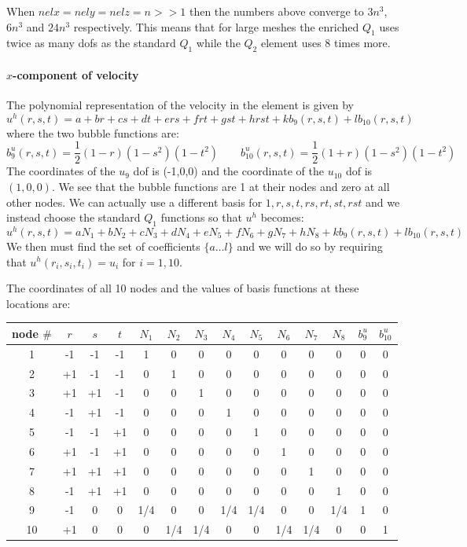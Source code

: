 When $nelx=nely=nelz=n>>1$ then the numbers above converge to 
$3n^3$, $6n^3$ and $24n^3$ respectively. This means that for large meshes 
the enriched $Q_1$ uses twice as many dofs as the standard $Q_1$ while the 
$Q_2$ element uses 8 times more. 



\paragraph{$x$-component of velocity} The polynomial representation of the velocity in the element is given by 
\[
u^h(r,s,t) = a + br +c s + d t +e rs + f rt + g st + h rst
+ k b_9(r,s,t) + l b_{10}(r,s,t)
\]
where the two bubble functions are:
\[
b_9^u(r,s,t)=\frac{1}{2}(1-r)(1-s^2)(1-t^2)
\qquad
b_{10}^u(r,s,t)=\frac{1}{2}(1+r)(1-s^2)(1-t^2)
\]
The coordinates of the $u_9$ dof is (-1,0,0) and the coordinate of the $u_{10}$ dof is $(1,0,0)$.
We see that the bubble functions are 1 at their nodes and zero at all other nodes.
We can actually use a different basis for ${1,r,s,t,rs,rt,st,rst}$ and we 
instead choose the standard $Q_1$ functions so that $u^h$ becomes:
\[
u^h(r,s,t) = aN_1 + b N_2 + cN_3 +dN_4 + eN_5 + fN_6 + gN_7 + hN_8 
+ k b_9(r,s,t) + l b_{10}(r,s,t)
\]
We then must find the set of coefficients $\{a \dots l\}$ and we will do so by 
requiring that $u^h(r_i,s_i,t_i)=u_i$ for $i=1,10$. 

The coordinates of all 10 nodes and the values of basis functions at these locations are:

\begin{center}
\begin{tabular}{c|ccc|cccccccc|cc}
\hline
node $\#$  & $r$ & $s$ & $t$ & $N_1$ & $N_2$ & $N_3$ & $N_4$ & $N_5$ & $N_6$ & $N_7$ & $N_8$ & $b_9^u$ & $b_{10}^u$\\
\hline\hline
1 & -1 & -1 & -1 & 1 & 0 & 0 & 0 & 0 & 0 & 0 & 0 & 0 & 0\\
2 & +1 & -1 & -1 & 0 & 1 & 0 & 0 & 0 & 0 & 0 & 0 & 0 & 0\\
3 & +1 & +1 & -1 & 0 & 0 & 1 & 0 & 0 & 0 & 0 & 0 & 0 & 0\\
4 & -1 & +1 & -1 & 0 & 0 & 0 & 1 & 0 & 0 & 0 & 0 & 0 & 0\\
5 & -1 & -1 & +1 & 0 & 0 & 0 & 0 & 1 & 0 & 0 & 0 & 0 & 0\\
6 & +1 & -1 & +1 & 0 & 0 & 0 & 0 & 0 & 1 & 0 & 0 & 0 & 0\\
7 & +1 & +1 & +1 & 0 & 0 & 0 & 0 & 0 & 0 & 1 & 0 & 0 & 0\\
8 & -1 & +1 & +1 & 0 & 0 & 0 & 0 & 0 & 0 & 0 & 1 & 0 & 0\\
9 & -1 & 0 & 0 & 1/4 & 0   & 0 & 1/4 & 1/4& 0   & 0 & 1/4 & 1 & 0\\
10& +1 & 0 & 0 & 0   & 1/4 & 1/4 & 0  &0 & 1/4 & 1/4 & 0 & 0 & 1\\
\hline
\end{tabular}
\end{center}

